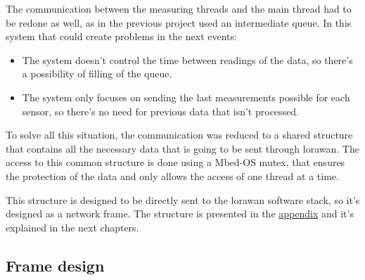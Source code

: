 The communication between the measuring threads and the main thread had to be redone as well, as in the previous project used an intermediate queue. In this system that could create problems in the next events:
\begin{itemize}
    \item The system doesn't control the time between readings of the data, so there's a possibility of filling of the queue.
    \item The system only focuses on sending the last measurements possible for each sensor, so there's no need for previous data that isn't processed.
\end{itemize}

To solve all this situation, the communication was reduced to a shared structure that contains all the necessary data that is going to be sent through \acrshort{lorawan}. The access to this common structure is done using a Mbed-OS mutex, that ensures the protection of the data and only allows the access of one thread at a time.

This structure is designed to be directly sent to the \acrshort{lorawan} software stack, so it's designed as a network frame. The structure is presented in the \hyperref[appendix]{appendix} and it's explained in the next chapters.
\subsection{Frame design}
